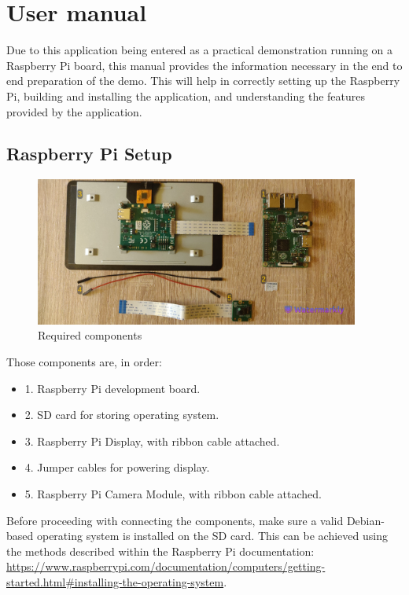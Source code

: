 \appendix
{}
\chapter{User manual}

Due to this application being entered as a practical demonstration running on a Raspberry Pi board, this manual
provides the information necessary in the end to end preparation of the demo. This will help in correctly
setting up the Raspberry Pi, building and installing the application, and understanding the features
provided by the application.

\section{Raspberry Pi Setup}

\begin{figure}[H]
	\includegraphics[width=0.95\textwidth, height=0.5\textwidth]{resources/Manual_Components.jpg}
	\caption{Required components}
\end{figure}

Those components are, in order:
\begin{itemize}
	\item 1. Raspberry Pi development board.
	\item 2. SD card for storing operating system.
	\item 3. Raspberry Pi Display, with ribbon cable attached.
	\item 4. Jumper cables for powering display.
	\item 5. Raspberry Pi Camera Module, with ribbon cable attached.
\end{itemize}

Before proceeding with connecting the components, make sure a valid Debian-based operating system is installed
on the SD card. This can be achieved using the methods described within the Raspberry Pi documentation:
\url{https://www.raspberrypi.com/documentation/computers/getting-started.html#installing-the-operating-system}.

